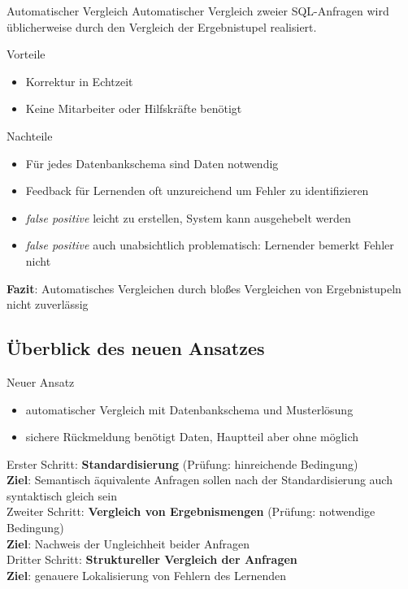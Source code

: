 \documentclass{beamer}
\begin{document}
\begin{frame}{Automatischer Vergleich}
Automatischer Vergleich zweier SQL-Anfragen wird üblicherweise durch den Vergleich der Ergebnistupel realisiert.
\begin{block}{Vorteile}
\begin{itemize}
\item Korrektur in Echtzeit
\item Keine Mitarbeiter oder Hilfskräfte benötigt
\end{itemize}
\end{block}

\begin{alertblock}{Nachteile}
\begin{itemize}
\item Für jedes Datenbankschema sind Daten notwendig
\item Feedback für Lernenden oft unzureichend um Fehler zu identifizieren
\item \textit{false positive} leicht zu erstellen, System kann ausgehebelt werden
\item \textit{false positive} auch unabsichtlich problematisch: Lernender bemerkt Fehler nicht
\end{itemize}
\end{alertblock}

\textbf{Fazit}: Automatisches Vergleichen durch bloßes Vergleichen von Ergebnistupeln nicht zuverlässig
\end{frame}

\subsection{Überblick des neuen Ansatzes}

\begin{frame}{Neuer Ansatz}
\begin{itemize}
\item automatischer Vergleich mit Datenbankschema und Musterlösung
\item sichere Rückmeldung benötigt Daten, Hauptteil aber ohne möglich
\end{itemize}

Erster Schritt: \textbf{Standardisierung} (Prüfung: hinreichende Bedingung) \\
\textbf{Ziel}: Semantisch äquivalente Anfragen sollen nach der Standardisierung auch syntaktisch gleich sein \\
\vspace{4mm}
Zweiter Schritt: \textbf{Vergleich von Ergebnismengen} (Prüfung: notwendige Bedingung)\\
\textbf{Ziel}: Nachweis der Ungleichheit beider Anfragen \\
\vspace{4mm}
Dritter Schritt: \textbf{Struktureller Vergleich der Anfragen}\\
\textbf{Ziel}: genauere Lokalisierung von Fehlern des Lernenden
\end{frame}
\end{document}
